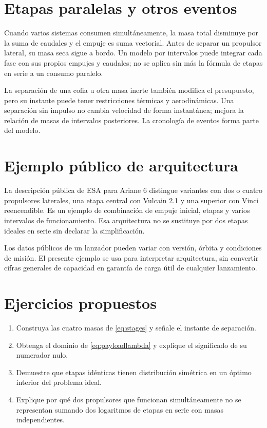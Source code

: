 \section{Etapas paralelas y otros eventos}
Cuando varios sistemas consumen simultáneamente, la masa total disminuye por la suma de caudales y el empuje es suma vectorial. Antes de separar un propulsor lateral, su masa seca sigue a bordo. Un modelo por intervalos puede integrar cada fase con sus propios empujes y caudales; no se aplica sin más la fórmula de etapas en serie a un consumo paralelo.

La separación de una cofia u otra masa inerte también modifica el presupuesto, pero su instante puede tener restricciones térmicas y aerodinámicas. Una separación sin impulso no cambia velocidad de forma instantánea; mejora la relación de masas de intervalos posteriores. La cronología de eventos forma parte del modelo.
\section{Ejemplo público de arquitectura}
La descripción pública de ESA para Ariane 6 distingue variantes con dos o cuatro propulsores laterales, una etapa central con Vulcain 2.1 y una superior con Vinci reencendible. Es un ejemplo de combinación de empuje inicial, etapas y varios intervalos de funcionamiento. Esa arquitectura no se sustituye por dos etapas ideales en serie sin declarar la simplificación.\cite{ARIANE}

Los datos públicos de un lanzador pueden variar con versión, órbita y condiciones de misión. El presente ejemplo se usa para interpretar arquitectura, sin convertir cifras generales de capacidad en garantía de carga útil de cualquier lanzamiento.
\section{Ejercicios propuestos}
\begin{enumerate}
\item Construya las cuatro masas de \eqref{eq:stages} y señale el instante de separación.
\item Obtenga el dominio de \eqref{eq:payloadlambda} y explique el significado de su numerador nulo.
\item Demuestre que etapas idénticas tienen distribución simétrica en un óptimo interior del problema ideal.
\item Explique por qué dos propulsores que funcionan simultáneamente no se representan sumando dos logaritmos de etapas en serie con masas independientes.
\end{enumerate}
